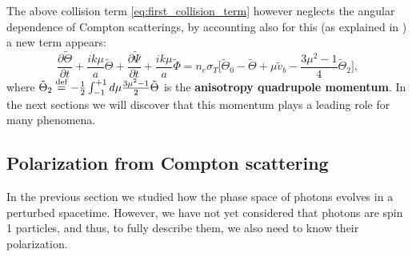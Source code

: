 The above collision term \eqref{eq:first_collision_term} however neglects the angular dependence of Compton scatterings, by accounting also for this (as explained in \cite{dodelson}) a new term appears:
\begin{equation}
    \frac{\partial \tilde\Theta}{\partial t} +\frac{ik\mu}{a}\tilde\Theta+\frac{\partial \tilde\Psi}{\partial t}+\frac{ik\mu}{a}\tilde\Phi=n_e \sigma_T\Bigg[\tilde\Theta_0-\tilde\Theta+\mu\tilde v_b-\frac{3\mu^2-1}{4}\tilde\Theta_2\Bigg],
\end{equation}
where $\tilde\Theta_2\stackrel{\text{def}}{=} -\frac{1}{2}\int_{-1}^{+1}d\mu\frac{3\mu^2-1}{2}\tilde\Theta$ is the \textbf{anisotropy quadrupole momentum}. In the next sections we will discover that this momentum plays a leading role for many phenomena.
\subsection{Polarization from Compton scattering}\label{sec:ComptonPolarization}
In the previous section we studied how the phase space of photons evolves in a perturbed spacetime. However, we have not yet considered that photons are spin 1 particles, and thus, to fully describe them, we also need to know their polarization.

